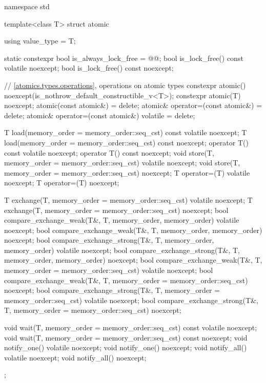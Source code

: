 %
%
\begin{codeblock}
namespace std {
  template<class T> struct atomic {
    using value_type = T;

    static constexpr bool is_always_lock_free = @@;
    bool is_lock_free() const volatile noexcept;
    bool is_lock_free() const noexcept;

    // \ref{atomics.types.operations}, operations on atomic types
    constexpr atomic() noexcept(is_nothrow_default_constructible_v<T>);
    constexpr atomic(T) noexcept;
    atomic(const atomic&) = delete;
    atomic& operator=(const atomic&) = delete;
    atomic& operator=(const atomic&) volatile = delete;

    T load(memory_order = memory_order::seq_cst) const volatile noexcept;
    T load(memory_order = memory_order::seq_cst) const noexcept;
    operator T() const volatile noexcept;
    operator T() const noexcept;
    void store(T, memory_order = memory_order::seq_cst) volatile noexcept;
    void store(T, memory_order = memory_order::seq_cst) noexcept;
    T operator=(T) volatile noexcept;
    T operator=(T) noexcept;

    T exchange(T, memory_order = memory_order::seq_cst) volatile noexcept;
    T exchange(T, memory_order = memory_order::seq_cst) noexcept;
    bool compare_exchange_weak(T&, T, memory_order, memory_order) volatile noexcept;
    bool compare_exchange_weak(T&, T, memory_order, memory_order) noexcept;
    bool compare_exchange_strong(T&, T, memory_order, memory_order) volatile noexcept;
    bool compare_exchange_strong(T&, T, memory_order, memory_order) noexcept;
    bool compare_exchange_weak(T&, T, memory_order = memory_order::seq_cst) volatile noexcept;
    bool compare_exchange_weak(T&, T, memory_order = memory_order::seq_cst) noexcept;
    bool compare_exchange_strong(T&, T, memory_order = memory_order::seq_cst) volatile noexcept;
    bool compare_exchange_strong(T&, T, memory_order = memory_order::seq_cst) noexcept;

    void wait(T, memory_order = memory_order::seq_cst) const volatile noexcept;
    void wait(T, memory_order = memory_order::seq_cst) const noexcept;
    void notify_one() volatile noexcept;
    void notify_one() noexcept;
    void notify_all() volatile noexcept;
    void notify_all() noexcept;
  };
}
\end{codeblock}

